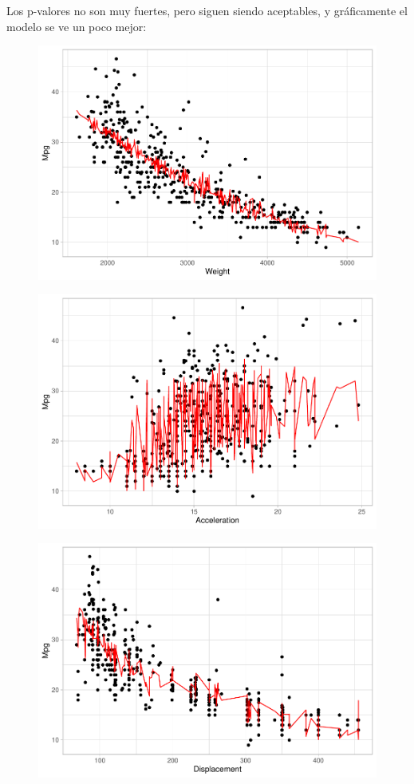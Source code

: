 Los p-valores no son muy fuertes, pero siguen siendo aceptables, y gráficamente el modelo se ve un poco mejor:
\begin{figure}[H]\includegraphics[width=.9\linewidth]{img/Regresion_files/figure-latex/unnamed-chunk-26-1} \caption{}\end{figure}

\begin{figure}[H]\includegraphics[width=.9\linewidth]{img/Regresion_files/figure-latex/unnamed-chunk-26-2} \caption{}\end{figure}

\begin{figure}[H]\includegraphics[width=.9\linewidth]{img/Regresion_files/figure-latex/unnamed-chunk-26-3} \caption{}\end{figure}

